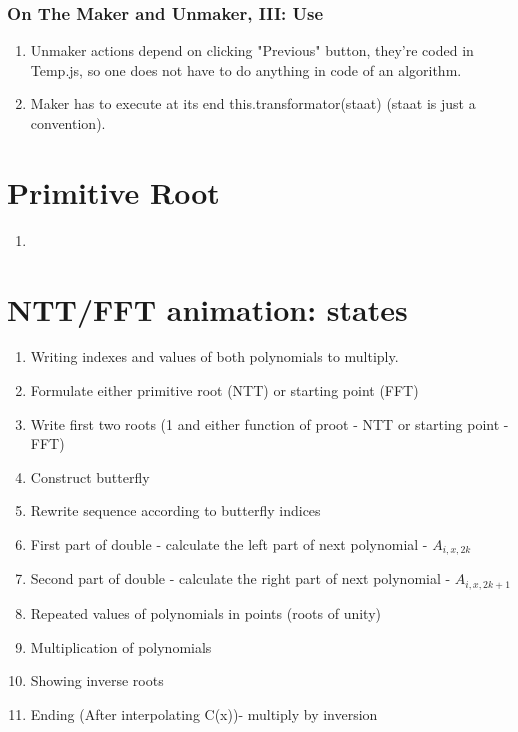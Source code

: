 \documentclass[12pt]{article}
\begin{document}
\subsubsection{On The Maker and Unmaker, III: Use}
\begin {enumerate}
	\item Unmaker actions depend on clicking "Previous" button, they're coded in Temp.js, so one does not have to do anything in code of an algorithm.
	\item Maker has to execute at its end this.transformator(staat) (staat is just a convention).
\end {enumerate}


\section{Primitive Root}
\begin{enumerate}
	\item 
\end{enumerate}

\section{NTT/FFT animation: states}
\begin {enumerate}
	\item Writing indexes and values of both polynomials to multiply.
	\item Formulate either primitive root (NTT) or starting point (FFT)
	\item Write first two roots (1 and either function of proot - NTT or starting point - FFT)
	\item Construct butterfly
	\item Rewrite sequence according to butterfly indices
	\item First part of double - calculate the left part of next polynomial - \(A_{i,x,2k}\)
	\item Second part of double - calculate the right part of next polynomial - \(A_{i,x,2k+1}\)
	\item Repeated values of polynomials in points (roots of unity)
	\item Multiplication of polynomials
	\item Showing inverse roots
	\item Ending (After interpolating C(x))- multiply by inversion
\end {enumerate}
\end{document}
